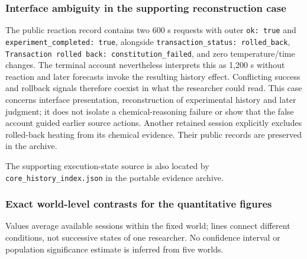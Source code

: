 \documentclass[10pt,a4paper]{article}
\begin{document}
\subsubsection{Interface ambiguity in the supporting reconstruction case}\label{interface-ambiguity-in-the-supporting-reconstruction-case}

The public reaction record contains two 600 s requests with outer \texttt{ok:\ true} and \texttt{experiment\_completed:\ true}, alongside \texttt{transaction\_status:\ rolled\_back}, \texttt{Transaction\ rolled\ back:\ constitution\_failed}, and zero temperature/time changes. The terminal account nevertheless interprets this as 1,200 s without reaction and later forecasts invoke the resulting history effect. Conflicting success and rollback signals therefore coexist in what the researcher could read. This case concerns interface presentation, reconstruction of experimental history and later judgment; it does not isolate a chemical-reasoning failure or show that the false account guided earlier source actions. Another retained session explicitly excludes rolled-back heating from its chemical evidence. Their public records are preserved in the archive.

The supporting execution-state source is also located by \texttt{core\_history\_index.json} in the portable evidence archive.

\subsubsection{Exact world-level contrasts for the quantitative figures}\label{exact-world-level-contrasts-for-the-quantitative-figures}

Values average available sessions within the fixed world; lines connect different conditions, not successive states of one researcher. No confidence interval or population significance estimate is inferred from five worlds.
\end{document}
